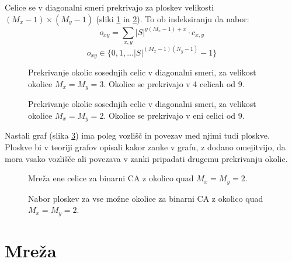 \documentclass[12pt,a4paper,openany,twoside]{book}
\begin{document}
Celice se v diagonalni smeri prekrivajo za ploskev velikosti \((M_x-1) \times (M_y-1)\) (sliki \ref{overlap_diagonal_moore} in \ref{overlap_diagonal_quad}).
To ob indeksiranju da nabor:
\begin{equation}
o_{xy} = \sum_{x,y} |S|^{y (M_x-1) + x} \cdot c_{x,y}
\end{equation}
\begin{equation}
o_{xy} \in \{0, 1, \dots |S|^{(M_x-1)(N_y-1)}-1\}
\end{equation}

\begin{figure}[htb]
\centerline{}
\caption[Prekrivanje okolic \(3 \times 3\) - diagonalno.]
{Prekrivanje okolic sosednjih celic v diagonalni smeri, za velikost okolice \(M_x=M_y=3\).
Okolice se prekrivajo v 4 celicah od 9.}
\label{overlap_diagonal_moore}
\end{figure}

\begin{figure}[htb]
\centerline{}
\caption[Prekrivanje okolic \(2 \times 2\) - diagonalno.]
{Prekrivanje okolic sosednjih celic v diagonalni smeri, za velikost okolice \(M_x=M_y=2\).
Okolice se prekrivajo v eni celici od 9.}
\label{overlap_diagonal_quad}
\end{figure}

Nastali graf (slika \ref{network_single}) ima poleg vozlišč in povezav med njimi tudi ploskve.
Ploskve bi v teoriji grafov opisali kakor zanke v grafu, z dodano omejitvijo,
da mora vsako vozlišče ali povezava v zanki pripadati drugemu prekrivanju okolic.

\begin{figure}[htb]
\centerline{}
\caption[Mreža ene celice.]{Mreža ene celice za binarni CA z okolico quad \(M_x=M_y=2\).}
\label{network_single}
\end{figure}

\begin{figure}[htb]
\centerline{}
\caption[Nabor ploskev.]{Nabor ploskev za vse možne okolice za binarni CA z okolico quad \(M_x=M_y=2\).}
\label{neighborhood_surfaces}
\end{figure}

\section{Mreža}
\end{document}

